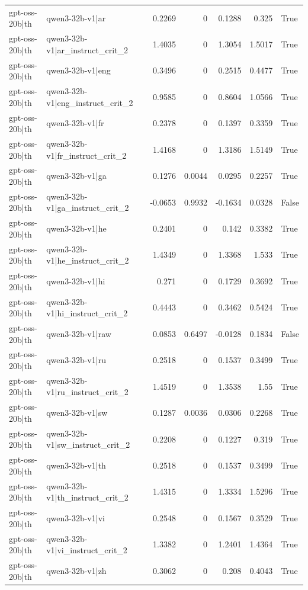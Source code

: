 \begin{table}
\begin{tabular}{l l r r r r l}
gpt-oss-20b|th & qwen3-32b-v1|ar & 0.2269 & 0 & 0.1288 & 0.325 & True \\
gpt-oss-20b|th & qwen3-32b-v1|ar_instruct_crit_2 & 1.4035 & 0 & 1.3054 & 1.5017 & True \\
gpt-oss-20b|th & qwen3-32b-v1|eng & 0.3496 & 0 & 0.2515 & 0.4477 & True \\
gpt-oss-20b|th & qwen3-32b-v1|eng_instruct_crit_2 & 0.9585 & 0 & 0.8604 & 1.0566 & True \\
gpt-oss-20b|th & qwen3-32b-v1|fr & 0.2378 & 0 & 0.1397 & 0.3359 & True \\
gpt-oss-20b|th & qwen3-32b-v1|fr_instruct_crit_2 & 1.4168 & 0 & 1.3186 & 1.5149 & True \\
gpt-oss-20b|th & qwen3-32b-v1|ga & 0.1276 & 0.0044 & 0.0295 & 0.2257 & True \\
gpt-oss-20b|th & qwen3-32b-v1|ga_instruct_crit_2 & -0.0653 & 0.9932 & -0.1634 & 0.0328 & False \\
gpt-oss-20b|th & qwen3-32b-v1|he & 0.2401 & 0 & 0.142 & 0.3382 & True \\
gpt-oss-20b|th & qwen3-32b-v1|he_instruct_crit_2 & 1.4349 & 0 & 1.3368 & 1.533 & True \\
gpt-oss-20b|th & qwen3-32b-v1|hi & 0.271 & 0 & 0.1729 & 0.3692 & True \\
gpt-oss-20b|th & qwen3-32b-v1|hi_instruct_crit_2 & 0.4443 & 0 & 0.3462 & 0.5424 & True \\
gpt-oss-20b|th & qwen3-32b-v1|raw & 0.0853 & 0.6497 & -0.0128 & 0.1834 & False \\
gpt-oss-20b|th & qwen3-32b-v1|ru & 0.2518 & 0 & 0.1537 & 0.3499 & True \\
gpt-oss-20b|th & qwen3-32b-v1|ru_instruct_crit_2 & 1.4519 & 0 & 1.3538 & 1.55 & True \\
gpt-oss-20b|th & qwen3-32b-v1|sw & 0.1287 & 0.0036 & 0.0306 & 0.2268 & True \\
gpt-oss-20b|th & qwen3-32b-v1|sw_instruct_crit_2 & 0.2208 & 0 & 0.1227 & 0.319 & True \\
gpt-oss-20b|th & qwen3-32b-v1|th & 0.2518 & 0 & 0.1537 & 0.3499 & True \\
gpt-oss-20b|th & qwen3-32b-v1|th_instruct_crit_2 & 1.4315 & 0 & 1.3334 & 1.5296 & True \\
gpt-oss-20b|th & qwen3-32b-v1|vi & 0.2548 & 0 & 0.1567 & 0.3529 & True \\
gpt-oss-20b|th & qwen3-32b-v1|vi_instruct_crit_2 & 1.3382 & 0 & 1.2401 & 1.4364 & True \\
gpt-oss-20b|th & qwen3-32b-v1|zh & 0.3062 & 0 & 0.208 & 0.4043 & True \\

\end{tabular}
\end{table}
